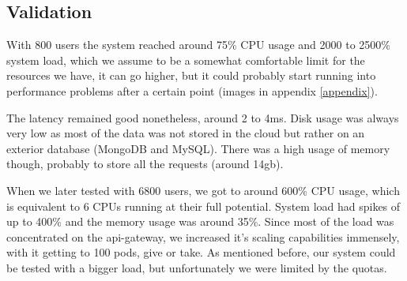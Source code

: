 \documentclass[oneside]{article}
\newcommand*\fpar{\hspace{1ex}}
\begin{document}
  \subsection{Validation}
  \label{sec:validation}
  \fpar With 800 users the system reached around 75\% CPU usage and 2000 to 2500\% system load, which we assume to be a somewhat comfortable limit for the resources we have, it can go higher, but it could probably start running into performance problems after a certain point (images in appendix \ref{appendix}).
  \par The latency remained good nonetheless, around 2 to 4ms. Disk usage was always very low as most of the data was not stored in the cloud but rather on an exterior database (MongoDB and MySQL). There was a high usage of memory though, probably to store all the requests (around 14gb).
  \par When we later tested with 6800 users, we got to around 600\% CPU usage, which is equivalent to 6 CPUs running at their full potential. System load had spikes of up to 400\% and the memory usage was around 35\%. Since most of the load was concentrated on the api-gateway, we increased it's scaling capabilities immensely, with it getting to 100 pods, give or take. As mentioned before, our system could be tested with a bigger load, but unfortunately we were limited by the quotas. 
\end{document}
